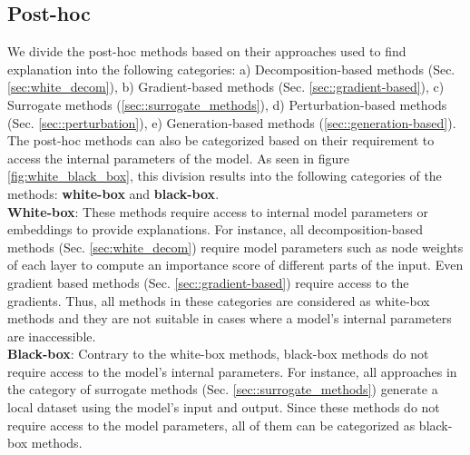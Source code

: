 \subsection{Post-hoc}
\label{sec:post_hoc}
We divide the post-hoc methods based on their approaches used to find explanation into the following categories: a) Decomposition-based methods (Sec. \ref{sec:white_decom}), b) Gradient-based methods (Sec. \ref{sec::gradient-based}), c) Surrogate methods (\ref{sec::surrogate_methods}), d) Perturbation-based methods (Sec. \ref{sec::perturbation}), e) Generation-based methods (\ref{sec::generation-based}). The post-hoc methods can also be categorized based on their requirement to access the internal parameters of the model. As seen in figure \ref{fig:white_black_box}, this division results into the following categories of the methods: \textbf{white-box} and \textbf{black-box}. \\
\noindent
\textbf{White-box}: These methods require access to internal model parameters or embeddings to provide explanations. For instance, all decomposition-based methods (Sec. \ref{sec:white_decom}) require model parameters such as node weights of each layer to compute an importance score of different parts of the input. Even gradient based methods (Sec. \ref{sec::gradient-based}) require access to the gradients. Thus, all methods in these categories are considered as white-box methods and they are not suitable in cases where a model's internal parameters are inaccessible.\\
\noindent
 \textbf{Black-box}: Contrary to the white-box methods, black-box methods do not require access to the model's internal parameters. For instance, all approaches in the category of surrogate methods (Sec. \ref{sec::surrogate_methods}) generate a local dataset using the model's input and output. Since these methods do not require access to the model parameters, all of them can be categorized as black-box methods.

